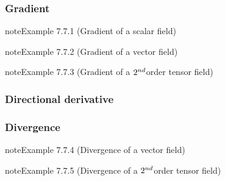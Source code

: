 \documentclass[letterpaper,10pt,english]{jupyterBook}
\begin{document}
\subsubsection{Gradient}
\label{\detokenize{ch/tensor-algebra-calculus/calculus-euclidean-spherical:gradient}}\label{\detokenize{ch/tensor-algebra-calculus/calculus-euclidean-spherical:tensor-calculus-spherical-differential-operators-gradient}}\label{ch/tensor-algebra-calculus/calculus-euclidean-spherical:example-0}
\begin{sphinxadmonition}{note}{Example 7.7.1 (Gradient of a scalar field)}


\end{sphinxadmonition}
\label{ch/tensor-algebra-calculus/calculus-euclidean-spherical:example-1}
\begin{sphinxadmonition}{note}{Example 7.7.2 (Gradient of a vector field)}


\end{sphinxadmonition}
\label{ch/tensor-algebra-calculus/calculus-euclidean-spherical:example-2}
\begin{sphinxadmonition}{note}{Example 7.7.3 (Gradient of a \protect\(2^{nd}\protect\)\sphinxhyphen{}order tensor field)}


\end{sphinxadmonition}


\subsubsection{Directional derivative}
\label{\detokenize{ch/tensor-algebra-calculus/calculus-euclidean-spherical:directional-derivative}}\label{\detokenize{ch/tensor-algebra-calculus/calculus-euclidean-spherical:tensor-calculus-spherical-differential-operators-directional-der}}

\subsubsection{Divergence}
\label{\detokenize{ch/tensor-algebra-calculus/calculus-euclidean-spherical:divergence}}\label{\detokenize{ch/tensor-algebra-calculus/calculus-euclidean-spherical:tensor-calculus-spherical-differential-operators-divergence}}\label{ch/tensor-algebra-calculus/calculus-euclidean-spherical:example-3}
\begin{sphinxadmonition}{note}{Example 7.7.4 (Divergence of a vector field)}


\end{sphinxadmonition}
\label{ch/tensor-algebra-calculus/calculus-euclidean-spherical:example-4}
\begin{sphinxadmonition}{note}{Example 7.7.5 (Divergence of a \protect\(2^{nd}\protect\)\sphinxhyphen{}order tensor field)}


\end{sphinxadmonition}
\end{document}
